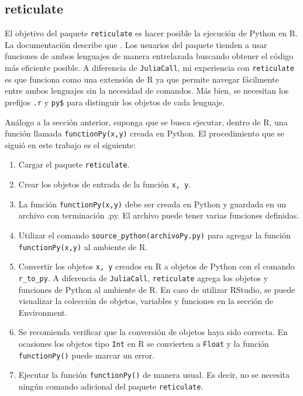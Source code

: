 \subsection{reticulate}

El objetivo del paquete \texttt{reticulate} es hacer posible la ejecución de \textsf{Python} en \textsf{R}. La documentación describe que  \cite{reticulate_package}. Los usuarios del paquete tienden a usar funciones de ambos lenguajes de manera entrelazada buscando obtener el código más eficiente posible. A diferencia de \texttt{JuliaCall}, mi experiencia con \texttt{reticulate} es que funciona como una extensión de \textsf{R} ya que permite navegar fácilmente entre ambos lenguajes sin la necesidad de comandos. Más bien, se necesitan los prefijos \texttt{.r} y \texttt{py\$} para distinguir los objetos de cada lenguaje. 

Análogo a la sección anterior, suponga que se busca ejecutar, dentro de \textsf{R}, una función llamada \texttt{functionPy(x,y)} creada en \textsf{Python}. El procedimiento que se siguió en este trabajo es el siguiente: 

\begin{enumerate}
	\item Cargar el paquete \texttt{reticulate}.
	
	\item Crear los objetos de entrada de la función \texttt{x, y}.
	
	\item La función \texttt{functionPy(x,y)} debe ser creada en \textsf{Python} y guardada en un archivo con terminación \textsf{.py}. El archivo puede tener varias funciones definidas. 
	
	\item Utilizar el comando \texttt{source\_python(archivoPy.py)} para agregar la función \texttt{functionPy(x,y)} al ambiente de \textsf{R}.
	
	\item Convertir los objetos \texttt{x, y} creados en \textsf{R} a objetos de \textsf{Python} con el comando \texttt{r\_to\_py}. A diferencia de \texttt{JuliaCall}, \texttt{reticulate} agrega los objetos y funciones de \textsf{Python} al ambiente de \textsf{R}. En caso de utilizar \textsf{RStudio}, se puede visualizar la colección de objetos, variables y funciones en la sección de \textsf{Environment}. 
	
	\item Se recomienda verificar que la conversión de objetos haya sido correcta. En ocasiones los objetos tipo \texttt{Int} en \textsf{R} se convierten a \texttt{Float} y la función \texttt{functionPy()} puede marcar un error. 
	
	\item Ejecutar la función \texttt{functionPy()} de manera usual. Es decir, no se necesita ningún comando adicional del paquete \texttt{reticulate}. 
	
	
\end{enumerate}

